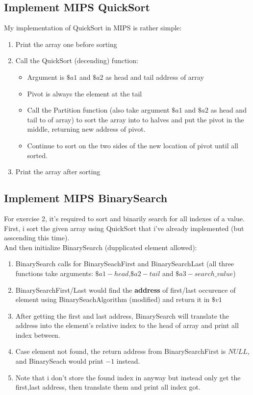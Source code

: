 \documentclass[a4paper]{article}
\begin{document}
\subsection{Implement MIPS QuickSort}
My implementation of QuickSort in MIPS is rather simple:
\begin{enumerate}
\item Print the array one before sorting
\item Call the QuickSort (decending) function:
	\begin{itemize}
	\item Argument is $\$a1$ and $\$a2$ as head and tail address of array
	\item Pivot is always the element at the tail
	\item Call the Partition function (also take argument $\$a1$ and $\$a2$ as head and tail to of array) to sort the array into to halves and put the pivot in the middle, returning new address of pivot.
	\item Continue to sort on the two sides of the new location of pivot until all sorted.
	\end{itemize}
\item Print the array after sorting
\end{enumerate}
\subsection{Implement MIPS BinarySearch}
For exercise 2, it's required to sort and binarily search for all indexes of a value.\\
First, i sort the given array using QuickSort that i've already implemented (but asscending this time).\\
And then initialize BinarySearch (dupplicated element allowed):
\begin{enumerate}
\item BinarySearch calls for BinarySeachFirst and BinarySearchLast (all three functions take arguments: $\$a1 - head$,$\$a2 - tail$ and $\$a3 - search\_value$)
\item BinarySearchFirst/Last would find the \textbf{address} of first/last occurence of element using BinarySeachAlgorithm (modified) and return it in $\$v1$
\item After getting the first and last address, BinarySearch will translate the address into the element's relative index to the head of array and print all index between.
\item Case element not found, the return address from BinarySearchFirst is $NULL$, and BinarySeach would print $-1$ instead.
\item Note that i don't store the found index in anyway but instead only get the first,last address, then translate them and print all index got.
\end{enumerate}
\end{document}
